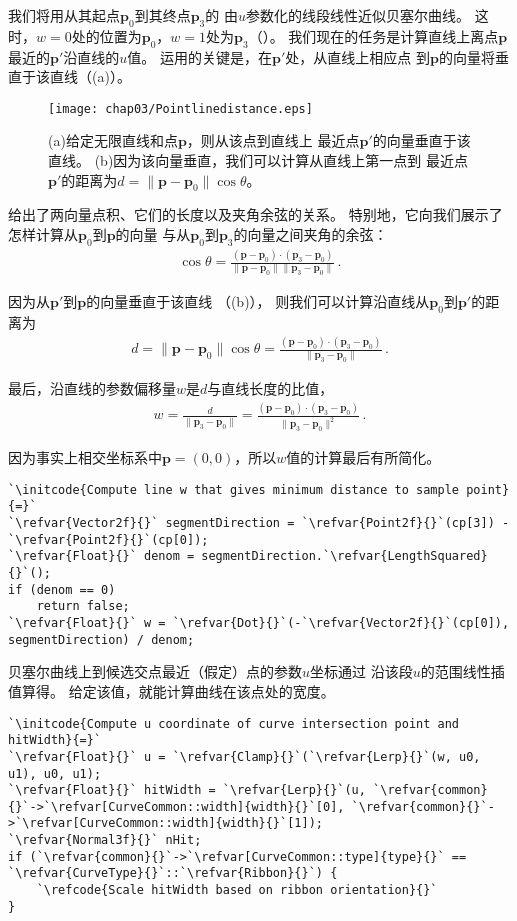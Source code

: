 我们将用从其起点$\bm p_0$到其终点$\bm p_3$的
由$u$参数化的线段线性近似贝塞尔曲线。
这时，$w=0$处的位置为$\bm p_0$，$w=1$处为$\bm p_3$（）。
我们现在的任务是计算直线上离点$\bm p$最近的$\bm p'$沿直线的$u$值。
运用的关键是，在$\bm p'$处，从直线上相应点
到$\bm p$的向量将垂直于该直线（(a)）。
\begin{figure}[htbp]
    \centering\texttt{[image: chap03/Pointlinedistance.eps]}
    \caption{(a)给定无限直线和点$\bm p$，则从该点到直线上
        最近点$\bm p'$的向量垂直于该直线。
        (b)因为该向量垂直，我们可以计算从直线上第一点到
        最近点$\bm p'$的距离为$d=\|\bm p-\bm p_0\|\cos\theta$。}
    \label{fig:3.23}
\end{figure}

给出了两向量点积、它们的长度以及夹角余弦的关系。
特别地，它向我们展示了怎样计算从$\bm p_0$到$\bm p$的向量
与从$\bm p_0$到$\bm p_3$的向量之间夹角的余弦：
\begin{align*}
    \cos\theta=\frac{(\bm p-\bm p_0)\cdot(\bm p_3-\bm p_0)}{\|\bm p-\bm p_0\|\|\bm p_3-\bm p_0\|}\, .
\end{align*}

因为从$\bm p'$到$\bm p$的向量垂直于该直线
（(b)），
则我们可以计算沿直线从$\bm p_0$到$\bm p'$的距离为
\begin{align*}
    d=\|\bm p-\bm p_0\|\cos\theta=\frac{(\bm p-\bm p_0)\cdot(\bm p_3-\bm p_0)}{\|\bm p_3-\bm p_0\|}\, .
\end{align*}

最后，沿直线的参数偏移量$w$是$d$与直线长度的比值，
\begin{align*}
    w=\frac{d}{\|\bm p_3-\bm p_0\|}=\frac{(\bm p-\bm p_0)\cdot(\bm p_3-\bm p_0)}{\|\bm p_3-\bm p_0\|^2}\, .
\end{align*}

因为事实上相交坐标系中$\bm p=(0,0)$，所以$w$值的计算最后有所简化。
\begin{lstlisting}
`\initcode{Compute line w that gives minimum distance to sample point}{=}`
`\refvar{Vector2f}{}` segmentDirection = `\refvar{Point2f}{}`(cp[3]) - `\refvar{Point2f}{}`(cp[0]);
`\refvar{Float}{}` denom = segmentDirection.`\refvar{LengthSquared}{}`();
if (denom == 0)
    return false;
`\refvar{Float}{}` w = `\refvar{Dot}{}`(-`\refvar{Vector2f}{}`(cp[0]), segmentDirection) / denom;
\end{lstlisting}

贝塞尔曲线上到候选交点最近（假定）点的参数$u$坐标通过
沿该段$u$的范围线性插值算得。
给定该值，就能计算曲线在该点处的宽度。
\begin{lstlisting}
`\initcode{Compute u coordinate of curve intersection point and hitWidth}{=}`
`\refvar{Float}{}` u = `\refvar{Clamp}{}`(`\refvar{Lerp}{}`(w, u0, u1), u0, u1);
`\refvar{Float}{}` hitWidth = `\refvar{Lerp}{}`(u, `\refvar{common}{}`->`\refvar[CurveCommon::width]{width}{}`[0], `\refvar{common}{}`->`\refvar[CurveCommon::width]{width}{}`[1]);
`\refvar{Normal3f}{}` nHit;
if (`\refvar{common}{}`->`\refvar[CurveCommon::type]{type}{}` == `\refvar{CurveType}{}`::`\refvar{Ribbon}{}`) {
    `\refcode{Scale hitWidth based on ribbon orientation}{}`
}
\end{lstlisting}

